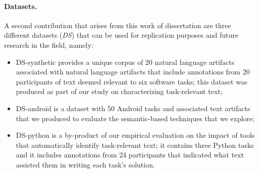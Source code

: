 
\paragraph{\textbf{Datasets.}} A second contribution that arises from this work of dissertation 
are three different datasets ({\small \textit{DS}}) that can be used for replication purposes and future research in the field, namely:
    
\begin{itemize}
    \item \acs{DS-synthetic} provides a unique corpus of 20 natural language artifacts associated
    with natural language artifacts that include annotations from 20 participants of text deemed relevant to six software tasks; this dataset was produced as part of our study on characterizing task-relevant text;
    
    \item \acs{DS-android} is a dataset with 50 Android tasks and associated text artifacts 
    that we produced to evaluate the semantic-based techniques that we explore;

    \item \acs{DS-python} is a by-product of our empirical evaluation on the impact of tools that automatically identify task-relevant text;
    it contains three Python tasks and it includes annotations from 24 participants that indicated what text assisted them in writing each task's solution.
\end{itemize}